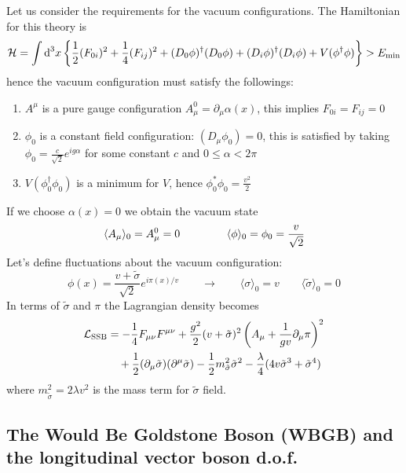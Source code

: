 \documentclass[TheoreticalPhy_ModB.tex]{subfiles}
\begin{document}
Let us consider the requirements for the vacuum configurations. The Hamiltonian for this theory is 
\[\mathcal H=\int\textup{d}^3x\left\{\frac12(F_{0i})^2+\frac14(F_{ij})^2+(D_0\phi)^\dagger(D_0\phi)+(D_i\phi)^\dagger(D_i\phi)+V(\phi^\dagger\phi)\right\}>E_{\text{min}}\]
hence the vacuum configuration must satisfy the followings:
\begin{enumerate}[label=(\arabic*)]
\item $A^\mu$ is a pure gauge configuration $A^0_\mu=\partial_\mu\alpha(x)$, this implies $F_{0i}=F_{ij}=0$
\item $\phi_0$ is a constant field configuration: $(D_\mu\phi_0)=0$, this is satisfied by taking $\phi_0=\frac c{\sqrt2}e^{ig\alpha}$ for some constant $c$ and $0\leq\alpha<2\pi$
\item $V(\phi_0^\dagger\phi_0)$ is a minimum for $V$, hence $\phi_0^*\phi_0=\frac{v^2}2$
\end{enumerate}
If we choose $\alpha(x)=0$ we obtain the vacuum state
\[\langle A_\mu\rangle_0=A^0_\mu=0\hspace{1.5cm}\langle\phi\rangle_0=\phi_0=\frac v{\sqrt2}\]
Let's define fluctuations about the vacuum configuration:
\[\phi(x)=\frac{v+\tilde\sigma}{\sqrt2}e^{i\pi(x)/v}\qquad\to\qquad\langle\sigma\rangle_0=v\qquad\langle\tilde\sigma\rangle_0=0\]
In terms of $\tilde\sigma$ and $\pi$ the Lagrangian density becomes
\begin{equation}\label{eqn:SSB-gauge-pi}\begin{split}
\mathcal L_{\text{SSB}}
&=-\frac14F_{\mu\nu}F^{\mu\nu}+\frac{g^2}2(v+\tilde\sigma)^2\left(A_\mu+\frac1{gv}\partial_\mu\pi\right)^2\\
&\quad+\frac12(\partial_\mu\tilde\sigma)(\partial^\mu\tilde\sigma)-\frac12m_{\tilde\sigma}^2\tilde\sigma^2-\frac\lambda4(4v\tilde\sigma^3+\tilde\sigma^4)
\end{split}\end{equation}
where $m_{\tilde\sigma}^2=2\lambda v^2$ is the mass term for $\tilde\sigma$ field. 

\subsection{The Would Be Goldstone Boson (WBGB) and the longitudinal vector boson d.o.f.}
\end{document}
